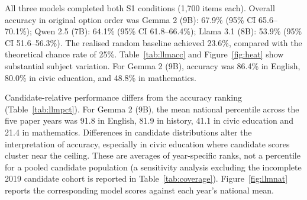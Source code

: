 All three models completed both S1 conditions (1,700 items each). Overall accuracy in original option order was Gemma 2 (9B): 67.9\% (95\% CI 65.6--70.1\%); Qwen 2.5 (7B): 64.1\% (95\% CI 61.8--66.4\%); Llama 3.1 (8B): 53.9\% (95\% CI 51.6--56.3\%). The realised random baseline achieved 23.6\%, compared with the theoretical chance rate of 25\%. Table~\ref{tab:llmacc} and Figure~\ref{fig:heat} show substantial subject variation. For Gemma 2 (9B), accuracy was 86.4\% in English, 80.0\% in civic education, and 48.8\% in mathematics.

Candidate-relative performance differs from the accuracy ranking (Table~\ref{tab:llmpct}). For Gemma 2 (9B), the mean national percentile across the five paper years was 91.8 in English, 81.9 in history, 41.1 in civic education and 21.4 in mathematics. Differences in candidate distributions alter the interpretation of accuracy, especially in civic education where candidate scores cluster near the ceiling. These are averages of year-specific ranks, not a percentile for a pooled candidate population (a sensitivity analysis excluding the incomplete 2019 candidate cohort is reported in Table~\ref{tab:coverage}). Figure~\ref{fig:llmnat} reports the corresponding model scores against each year's national mean.
